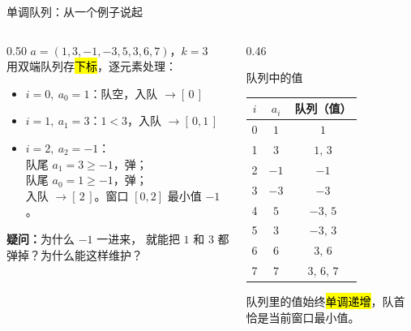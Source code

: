 \documentclass[aspectratio=169]{beamer}
\begin{document}
\begin{frame}{单调队列：从一个例子说起}
    \begin{columns}[T]
        \begin{column}{0.50\textwidth}
            \small
            $a=(1,3,-1,-3,5,3,6,7)$，$k=3$\\
            \vspace{0.3em}
            用双端队列存\hl{下标}，逐元素处理：
            \begin{itemize}
                \item $i=0,\ a_0=1$：队空，入队 $\to [\,0\,]$
                \item $i=1,\ a_1=3$：$1<3$，入队 $\to [\,0,1\,]$
                \item $i=2,\ a_2=-1$：\\
                    {
                       队尾 $a_1=3\ge -1$，弹；\\
                       队尾 $a_0=1\ge -1$，弹；\\
                       入队 $\to [\,2\,]$。窗口 $[0,2]$ 最小值 $-1$。
                    }
            \end{itemize}
            \vspace{0.3em}
            \textbf{疑问：}为什么 $-1$ 一进来，
            就能把 $1$ 和 $3$ 都弹掉？为什么能这样维护？
        \end{column}
        \begin{column}{0.46\textwidth}
            \begin{exampleblock}{队列中的值}
                \footnotesize
                \begin{tabular}{c|c|c}
                    $i$ & $a_i$ & 队列（值）\\\hline
                    0 & $1$  & $1$ \\
                    1 & $3$  & $1,\,3$ \\
                    2 & $-1$ & $-1$ \\
                    3 & $-3$ & $-3$ \\
                    4 & $5$  & $-3,\,5$ \\
                    5 & $3$  & $-3,\,3$ \\
                    6 & $6$  & $3,\,6$ \\
                    7 & $7$  & $3,\,6,\,7$ \\
                \end{tabular}
            \end{exampleblock}
            \footnotesize
            队列里的值始终\hl{单调递增}，队首恰是当前窗口最小值。
        \end{column}
    \end{columns}
\end{frame}
\end{document}
